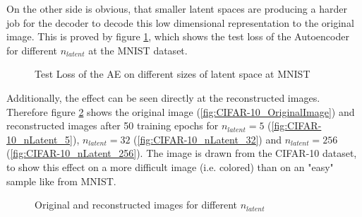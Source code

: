 \documentclass[12pt,DIV14,BCOR12mm,a4paper,footexclude,headinclude,halfparskip-,twoside,openright,openany,cleardoubleempty,idxtotoc,bibtotoc]{scrreprt} %
\numberwithin{equation}{chapter}
\begin{document}
On the other side is obvious, that smaller latent spaces are producing a harder job for the decoder to decode this low dimensional representation to the original image. This is proved by figure \ref{fig:TestLoss_AE_latentSpace}, which shows the test loss of the Autoencoder for different $n_{latent}$ at the MNIST dataset.
	\begin{figure}[htb!]
		\centering
		\resizebox{0.45\linewidth}{!}{}
		\caption{Test Loss of the AE on different sizes of latent space at MNIST}
		\label{fig:TestLoss_AE_latentSpace}
	\end{figure}
Additionally, the effect can be seen directly at the reconstructed images. Therefore figure \ref{fig:Reconstructions_nLatent} shows the original image (\ref{fig:CIFAR-10_OriginalImage}) and reconstructed images after 50 training epochs for $n_{latent}=5$ (\ref{fig:CIFAR-10_nLatent_5}), $n_{latent}=32$ (\ref{fig:CIFAR-10_nLatent_32}) and $n_{latent}=256$ (\ref{fig:CIFAR-10_nLatent_256}). The image is drawn from the CIFAR-10 dataset, to show this effect on a more difficult image (i.e. colored) than on an "easy" sample like from MNIST.
\begin{figure}[htb!]
	\centering
	\qquad
	\qquad
	\qquad
	\qquad
	\caption{Original and reconstructed images for different $n_{latent}$}
	\label{fig:Reconstructions_nLatent}
\end{figure}
\end{document}
